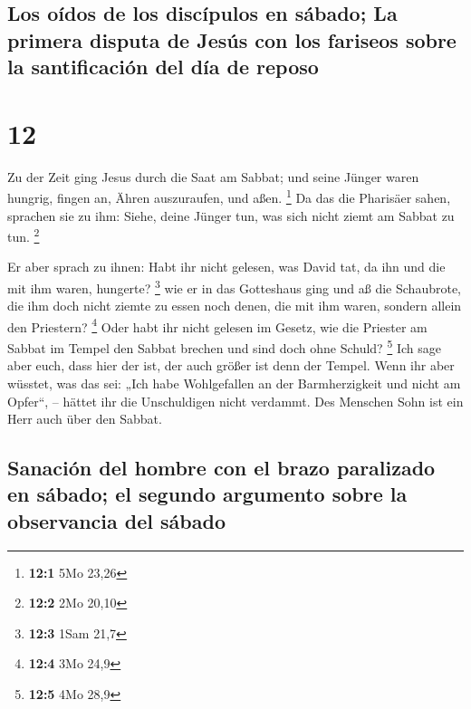 \hypertarget{los-ouxeddos-de-los-discuxedpulos-en-suxe1bado-la-primera-disputa-de-jesuxfas-con-los-fariseos-sobre-la-santificaciuxf3n-del-duxeda-de-reposo}{%
\subsection{Los oídos de los discípulos en sábado; La primera disputa de
Jesús con los fariseos sobre la santificación del día de
reposo}\label{los-ouxeddos-de-los-discuxedpulos-en-suxe1bado-la-primera-disputa-de-jesuxfas-con-los-fariseos-sobre-la-santificaciuxf3n-del-duxeda-de-reposo}}

\hypertarget{section-11}{%
\section{12}\label{section-11}}

 Zu der Zeit ging Jesus durch die Saat am Sabbat; und
seine Jünger waren hungrig, fingen an, Ähren auszuraufen, und aßen.
\footnote{\textbf{12:1} 5Mo 23,26}  Da das die Pharisäer
sahen, sprachen sie zu ihm: Siehe, deine Jünger tun, was sich nicht
ziemt am Sabbat zu tun. \footnote{\textbf{12:2} 2Mo 20,10}

 Er aber sprach zu ihnen: Habt ihr nicht gelesen, was
David tat, da ihn und die mit ihm waren, hungerte? \footnote{\textbf{12:3}
  1Sam 21,7}  wie er in das Gotteshaus ging und aß die
Schaubrote, die ihm doch nicht ziemte zu essen noch denen, die mit ihm
waren, sondern allein den Priestern? \footnote{\textbf{12:4} 3Mo 24,9}
 Oder habt ihr nicht gelesen im Gesetz, wie die Priester
am Sabbat im Tempel den Sabbat brechen und sind doch ohne Schuld?
\footnote{\textbf{12:5} 4Mo 28,9}  Ich sage aber euch,
dass hier der ist, der auch größer ist denn der Tempel. 
Wenn ihr aber wüsstet, was das sei: „Ich habe Wohlgefallen an der
Barmherzigkeit und nicht am Opfer``, -- hättet ihr die Unschuldigen
nicht verdammt.  Des Menschen Sohn ist ein Herr auch über
den Sabbat.

\hypertarget{sanaciuxf3n-del-hombre-con-el-brazo-paralizado-en-suxe1bado-el-segundo-argumento-sobre-la-observancia-del-suxe1bado}{%
\subsection{Sanación del hombre con el brazo paralizado en sábado; el
segundo argumento sobre la observancia del
sábado}\label{sanaciuxf3n-del-hombre-con-el-brazo-paralizado-en-suxe1bado-el-segundo-argumento-sobre-la-observancia-del-suxe1bado}}


